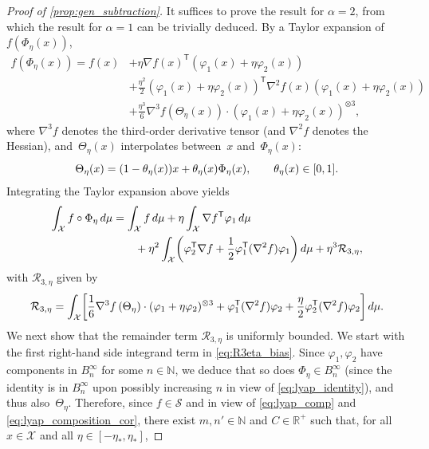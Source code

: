 \documentclass[11pt]{article}
\newcommand{\R}{\mathbb{R}}
\newcommand{\N}{\mathbb{N}}
\renewcommand{\S}{\mathscr{S}}
\renewcommand{\t}{\mathsf T}
\DeclarePairedDelimiter\paren{\lparen}{\rparen}
\DeclarePairedDelimiter\bkt{\lbrack}{\rbrack}
\theoremstyle{definition}
\begin{document}
\begin{proof}[Proof of \cref{prop:gen_subtraction}]
It suffices to prove the result for $\alpha=2$, from which the result for $\alpha=1$ can be trivially deduced. By a Taylor expansion of $f(\Phi_\eta(x))$,
\begin{align*}
		f(\Phi_\eta(x)) = f(x) &+ \eta \nabla f(x)^\t(\varphi_1(x) + \eta\varphi_2(x)) \\
		&+ \frac{\eta^2}{2}(\varphi_1(x) + \eta\varphi_2(x))^\t \nabla^2 f(x)(\varphi_1(x) + \eta\varphi_2(x)) \\
		&+ \frac{\eta^3}{6} \nabla^3f\left(\Theta_\eta(x)\right)\cdot (\varphi_1(x) + \eta\varphi_2(x))^{\otimes 3},
\end{align*}
where $\nabla^3 f$ denotes the third-order derivative tensor (and $\nabla^2 f$ denotes the Hessian), and~$\Theta_\eta(x)$ interpolates between~$x$ and~$\Phi_\eta(x)$:
\begin{equation}
    \notag
	\Theta_\eta(x) = (1-\theta_\eta(x))x + \theta_\eta(x)\Phi_\eta(x), \qquad \theta_\eta(x) \in [0,1].
\end{equation}
Integrating the Taylor expansion above yields
\begin{equation}
\label{eq:prop_rhs_terms}
\begin{split}
	\int_\mathcal{X} f\circ\Phi_\eta \, d\mu &= \int_\mathcal{X} f \, d\mu + \eta \int_\mathcal{X}\nabla f^\t \varphi_1 \, d\mu \\
 &\qquad + \eta^2\int_\mathcal{X} \paren*{\varphi_2^\t \nabla f+\frac{1}{2}\varphi_1^\t(\nabla^2 f)\varphi_1} \, d\mu + \eta^3\mathcal{R}_{3,\eta},
 \end{split}
\end{equation}
with $\mathcal{R}_{3,\eta}$ given by \begin{equation}
\mathcal{R}_{3,\eta} = \int_\mathcal{X} \bkt*{\frac{1}{6}\nabla^3f\left(\Theta_\eta\right)\cdot (\varphi_1 + \eta\varphi_2)^{\otimes 3} + \varphi_1^\t (\nabla^2 f)\varphi_2 + \frac{\eta}{2}\varphi_2^\t (\nabla^2 f)\varphi_2} \, d\mu.
	\label{eq:R3eta_bias}
\end{equation}
We next show that the remainder term $\mathcal{R}_{3,\eta}$ is uniformly bounded. We start with the first right-hand side integrand term in \eqref{eq:R3eta_bias}. Since $\varphi_1,\varphi_2$ have components in $B^\infty_n$ for some $n\in\N$, we deduce that so does $\Phi_\eta\in B^\infty_n$ (since the identity is in $B^\infty_n$ upon possibly increasing $n$ in view of \eqref{eq:lyap_identity}), and thus also~$\Theta_\eta$. Therefore, since $f\in\S$ and in view of \eqref{eq:lyap_comp} and \eqref{eq:lyap_composition_cor}, there exist $m,n'\in\N$ and $C\in\R^+$ such that, for all~$x\in\mathcal{X}$ and all $\eta\in [-\eta_*,\eta_*]$,

\end{proof}
\end{document}
